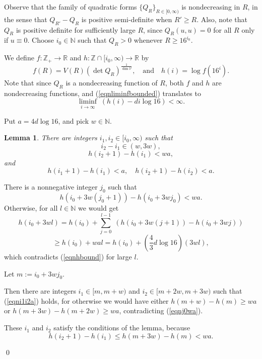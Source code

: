 \documentclass[12pt]{amsart}
\numberwithin{equation}{section}
\theoremstyle{plain}
\newtheorem{lemma}[equation]{Lemma}
\theoremstyle{remark}
\theoremstyle{definition}
\newcommand{\ra}{\rightarrow}
\newcommand{\N}{\mathbb N}
\newcommand{\R}{\mathbb R}
\newcommand{\V}{{\mathcal V}}
\newcommand{\Z}{\mathbb Z}
\def\ra{\rightarrow}
\def\defeq{:=}
\begin{document}
\bigskip
Observe that the family of quadratic
forms  $\{Q_R\}_{R\in[0,\infty)}$ is nondecreasing
in $R$, in the sense that $Q_{R'}-Q_{R}$ is positive
semi-definite when $R'\geq R$.  Also,
note that $Q_R$ is  positive definite for sufficiently 
large $R$, since $Q_R(u,u)=0$
for all $R$ only if $u\equiv 0$.  Choose $i_0\in\N$
such that $Q_R>0$ whenever $R\geq 16^{i_0}$.


We define $f:\Z_+\ra \R$ and $h:\Z\cap[i_0,\infty)\ra \R$ by
$$
f(R)=V(R)\left(\det Q_R\right)^{\frac{1}{\dim\V}},
\quad\mbox{and}\quad h(i)=\log f(16^i).$$
Note that since $Q_R$ is a nondecreasing function of $R$, 
both $f$ and $h$ are nondecreasing functions, and 
(\ref{eqnliminfbounded}) translates to
\begin{equation}
\label{eqnhbound}
\liminf_{i\ra\infty}\;\left(h(i)-di\log 16\right)<\infty.
\end{equation}

  Put $a=4d\log 16$, and pick $w\in \N$. 
\begin{lemma}
There are integers $i_1,i_2\in [i_0,\infty)$
such that 
\begin{equation}
i_2-i_1\in (w,3w),
\end{equation}
\begin{equation}
\label{eqni1i2wa}
h(i_2+1)-h(i_1)< wa,
\end{equation}
and
\begin{equation}
\label{eqni1i2a}
h(i_1+1)-h(i_1)<a, \quad h(i_2+1)-h(i_2)<a.
\end{equation}
\end{lemma}
\proof
There is a nonnegative integer $j_0$ such that 
\begin{equation}
\label{eqnj0wa}
h(i_0+3w(j_0+1))-h(i_0+3wj_0)<wa.
\end{equation}  Otherwise, for all 
$l\in \N$ we would get
$$
h(i_0+3wl)=h(i_0)+\sum_{j=0}^{l-1}\;(h(i_0+3w(j+1))-h(i_0+3wj))
$$
$$
\geq h(i_0)+wal=h(i_0)+\left(\frac43 d\log 16\right)\left(3wl\right),
$$
which contradicts (\ref{eqnhbound}) for large $l$.

Let $m\defeq i_0+3wj_0$.  

Then there are integers 
$i_1\in [m,m+w)$ and $i_2\in [m+2w,m+3w)$ such that
(\ref{eqni1i2a}) holds, for otherwise we would have
either $h(m+w)-h(m)\geq wa$ or $h(m+3w)-h(m+2w)\geq wa$,
contradicting (\ref{eqnj0wa}).  

These $i_1$ and $i_2$ satisfy the conditions of the lemma, 
because
$$
h(i_2+1)-h(i_1)\leq h(m+3w)-h(m)<wa.
$$

\qed
\end{document}
